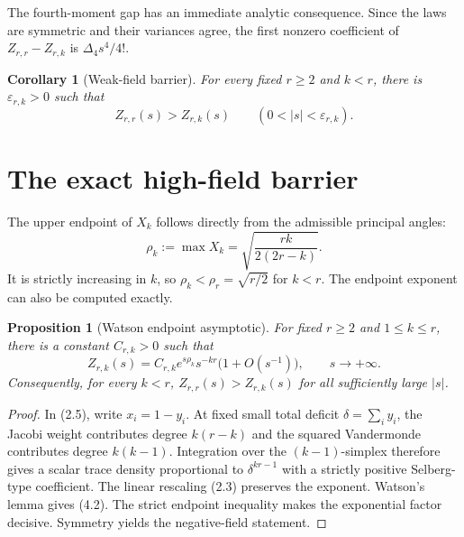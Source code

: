 \documentclass[11pt]{article}
\newtheorem{proposition}[theorem]{Proposition}
\newtheorem{corollary}[theorem]{Corollary}
\begin{document}
The fourth-moment gap has an immediate analytic consequence.  Since the
laws are symmetric and their variances agree, the first nonzero coefficient
of $Z_{r,r}-Z_{r,k}$ is $\Delta_4s^4/4!$.

\begin{corollary}[Weak-field barrier]
For every fixed $r\ge2$ and $k<r$, there is $\varepsilon_{r,k}>0$ such that
\begin{equation}
 Z_{r,r}(s)>Z_{r,k}(s)\qquad(0<|s|<\varepsilon_{r,k}).      \tag{3.12}
\end{equation}
\end{corollary}

\section{The exact high-field barrier}

The upper endpoint of $X_k$ follows directly from the admissible principal
angles:
\begin{equation}
 \rho_k:=\max X_k=\sqrt{\frac{rk}{2(2r-k)}}.                \tag{4.1}
\end{equation}
It is strictly increasing in $k$, so $\rho_k<\rho_r=\sqrt{r/2}$ for $k<r$.
The endpoint exponent can also be computed exactly.

\begin{proposition}[Watson endpoint asymptotic]
For fixed $r\ge2$ and $1\le k\le r$, there is a constant $C_{r,k}>0$ such
that
\begin{equation}
 Z_{r,k}(s)=C_{r,k}e^{s\rho_k}s^{-kr}\bigl(1+O(s^{-1})\bigr),
 \qquad s\to+\infty.                                      \tag{4.2}
\end{equation}
Consequently, for every $k<r$, $Z_{r,r}(s)>Z_{r,k}(s)$ for all sufficiently
large $|s|$.
\end{proposition}

\begin{proof}
In (2.5), write $x_i=1-y_i$.  At fixed small total deficit
$\delta=\sum_i y_i$, the Jacobi weight contributes degree $k(r-k)$ and the
squared Vandermonde contributes degree $k(k-1)$.  Integration over the
$(k-1)$-simplex therefore gives a scalar trace density proportional to
$\delta^{kr-1}$ with a strictly positive Selberg-type coefficient.  The
linear rescaling (2.3) preserves the exponent.  Watson's lemma gives (4.2).
The strict endpoint inequality makes the exponential factor decisive.
Symmetry yields the negative-field statement.
\end{proof}
\end{document}
